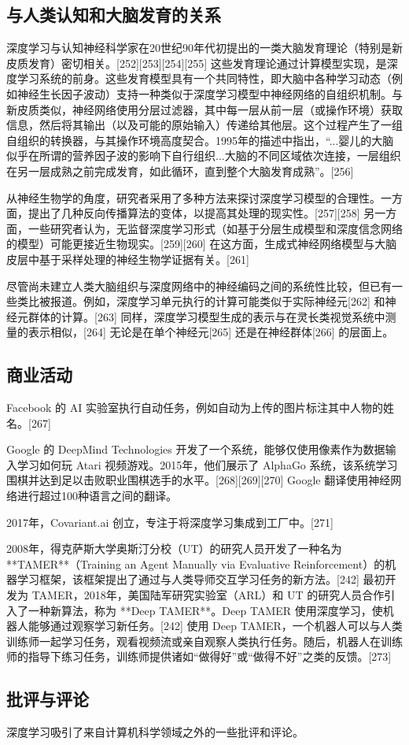 \subsection{与人类认知和大脑发育的关系}  
深度学习与认知神经科学家在20世纪90年代初提出的一类大脑发育理论（特别是新皮质发育）密切相关。[252][253][254][255] 这些发育理论通过计算模型实现，是深度学习系统的前身。这些发育模型具有一个共同特性，即大脑中各种学习动态（例如神经生长因子波动）支持一种类似于深度学习模型中神经网络的自组织机制。与新皮质类似，神经网络使用分层过滤器，其中每一层从前一层（或操作环境）获取信息，然后将其输出（以及可能的原始输入）传递给其他层。这个过程产生了一组自组织的转换器，与其操作环境高度契合。1995年的描述中指出，“...婴儿的大脑似乎在所谓的营养因子波的影响下自行组织...大脑的不同区域依次连接，一层组织在另一层成熟之前完成发育，如此循环，直到整个大脑发育成熟”。[256]  

从神经生物学的角度，研究者采用了多种方法来探讨深度学习模型的合理性。一方面，提出了几种反向传播算法的变体，以提高其处理的现实性。[257][258] 另一方面，一些研究者认为，无监督深度学习形式（如基于分层生成模型和深度信念网络的模型）可能更接近生物现实。[259][260] 在这方面，生成式神经网络模型与大脑皮层中基于采样处理的神经生物学证据有关。[261]  

尽管尚未建立人类大脑组织与深度网络中的神经编码之间的系统性比较，但已有一些类比被报道。例如，深度学习单元执行的计算可能类似于实际神经元[262] 和神经元群体的计算。[263] 同样，深度学习模型生成的表示与在灵长类视觉系统中测量的表示相似，[264] 无论是在单个神经元[265] 还是在神经群体[266] 的层面上。
\subsection{商业活动}  
Facebook 的 AI 实验室执行自动任务，例如自动为上传的图片标注其中人物的姓名。[267]  

Google 的 DeepMind Technologies 开发了一个系统，能够仅使用像素作为数据输入学习如何玩 Atari 视频游戏。2015年，他们展示了 AlphaGo 系统，该系统学习围棋并达到足以击败职业围棋选手的水平。[268][269][270] Google 翻译使用神经网络进行超过100种语言之间的翻译。  

2017年，Covariant.ai 创立，专注于将深度学习集成到工厂中。[271]  

2008年，得克萨斯大学奥斯汀分校（UT）的研究人员开发了一种名为 **TAMER**（Training an Agent Manually via Evaluative Reinforcement）的机器学习框架，该框架提出了通过与人类导师交互学习任务的新方法。[242] 最初开发为 TAMER，2018年，美国陆军研究实验室（ARL）和 UT 的研究人员合作引入了一种新算法，称为 **Deep TAMER**。Deep TAMER 使用深度学习，使机器人能够通过观察学习新任务。[242] 使用 Deep TAMER，一个机器人可以与人类训练师一起学习任务，观看视频流或亲自观察人类执行任务。随后，机器人在训练师的指导下练习任务，训练师提供诸如“做得好”或“做得不好”之类的反馈。[273]  
\subsection{批评与评论}  
深度学习吸引了来自计算机科学领域之外的一些批评和评论。


